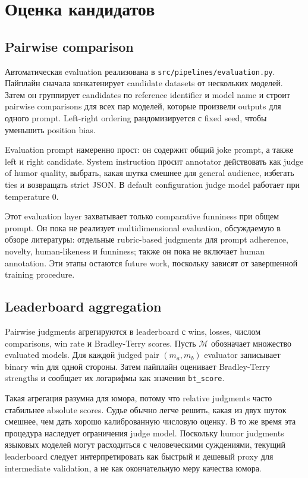 \section{Оценка кандидатов}

\subsection{Pairwise comparison}

Автоматическая evaluation реализована в \texttt{src/pipelines/evaluation.py}. Пайплайн сначала конкатенирует candidate datasets от нескольких моделей. Затем он группирует candidates по reference identifier и model name и строит pairwise comparisons для всех пар моделей, которые произвели outputs для одного prompt. Left-right ordering рандомизируется с fixed seed, чтобы уменьшить position bias.

Evaluation prompt намеренно прост: он содержит общий joke prompt, а также left и right candidate. System instruction просит annotator действовать как judge of humor quality, выбрать, какая шутка смешнее для general audience, избегать ties и возвращать strict JSON. В default configuration judge model работает при temperature \(0\).

Этот evaluation layer захватывает только comparative funniness при общем prompt. Он пока не реализует multidimensional evaluation, обсуждаемую в обзоре литературы: отдельные rubric-based judgments для prompt adherence, novelty, human-likeness и funniness; также он пока не включает human annotation. Эти этапы остаются future work, поскольку зависят от завершенной training procedure.

\subsection{Leaderboard aggregation}

Pairwise judgments агрегируются в leaderboard с wins, losses, числом comparisons, win rate и Bradley-Terry scores. Пусть \(\mathcal{M}\) обозначает множество evaluated models. Для каждой judged pair \((m_a,m_b)\) evaluator записывает binary win для одной стороны. Затем пайплайн оценивает Bradley-Terry strengths и сообщает их логарифмы как значения \texttt{bt\_score}.

Такая агрегация разумна для юмора, потому что relative judgments часто стабильнее absolute scores. Судье обычно легче решить, какая из двух шуток смешнее, чем дать хорошо калиброванную числовую оценку. В то же время эта процедура наследует ограничения judge model. Поскольку humor judgments языковых моделей могут расходиться с человеческими суждениями, текущий leaderboard следует интерпретировать как быстрый и дешевый proxy для intermediate validation, а не как окончательную меру качества юмора.

